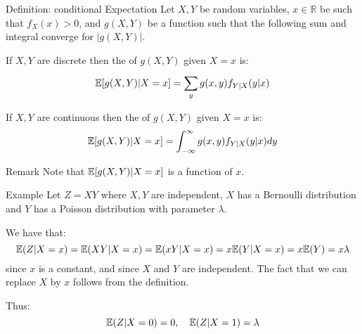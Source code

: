 \documentclass[a4paper]{article}
\begin{document}
\begin{parag}{Definition: conditional Expectation}
    Let $X, Y$ be random variables, $x \in \mathbb{R}$ be such that $f_X\left(x\right) > 0$, and $g\left(X, Y\right)$ be a function such that the following sum and integral converge for $\left|g\left(X, Y\right)\right|$.

    If $X, Y$ are discrete then the  of $g\left(X, Y\right)$ given $X = x$ is: 
    \[\exval\left[g\left(X, Y\right)|X = x\right] = \sum_{y}^{} g\left(x, y\right) f_{Y|X}\left(y|x\right)\]

    If $X, Y$ are continuous then the  of $g\left(X, Y\right)$ given $X = x$ is: 
    \[\exval\left[g\left(X, Y\right) | X = x\right] = \int_{-\infty}^{\infty} g\left(x, y\right) f_{Y|X}\left(y|x\right)dy\]

    \begin{subparag}{Remark}
        Note that $\exval\left[g\left(X, Y\right)| X = x\right]$ is a function of $x$.
    \end{subparag}
\end{parag}

\begin{parag}{Example}
    Let $Z = XY$ where $X, Y$ are independent, $X$ has a Bernoulli distribution and $Y$ has a Poisson distribution with parameter $\lambda$.

    We have that: 
    \[\exval\left(Z | X= x\right) = \exval\left(XY | X = x\right) = \exval\left(x Y | X= x\right) = x\exval\left(Y | X= x\right) = x\exval\left(Y\right) = x \lambda\]
    since $x$ is a constant, and since $X$ and $Y$ are independent. The fact that we can replace $X$ by $x$ follows from the definition.

    Thus: 
    \[\exval\left(Z | X = 0\right) = 0, \mathspace \exval\left(Z | X = 1\right) = \lambda\]
\end{parag}
\end{document}
